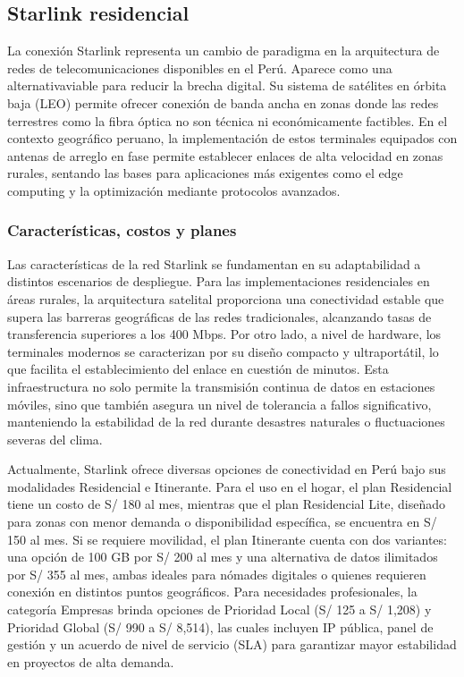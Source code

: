 \subsection{Starlink residencial}

La conexión Starlink representa un cambio de paradigma en la arquitectura de redes de telecomunicaciones disponibles en el Perú. 
Aparece como una alternativaviable para reducir la brecha digital. 
Su sistema de satélites en órbita baja (LEO) permite ofrecer conexión de
banda ancha en zonas donde las redes terrestres como la fibra óptica no son técnica ni económicamente
factibles.
En el contexto geográfico peruano, la implementación de estos terminales equipados con antenas de arreglo en fase permite 
establecer enlaces de alta velocidad en zonas rurales, sentando las bases para aplicaciones más exigentes como el edge computing y la optimización mediante protocolos avanzados. 

\subsubsection{Características, costos y planes}

Las características de la red Starlink se fundamentan en su adaptabilidad a distintos escenarios de despliegue. 
Para las implementaciones residenciales en áreas rurales, la arquitectura satelital proporciona una conectividad estable que supera las barreras geográficas de las redes tradicionales, 
alcanzando tasas de transferencia superiores a los 400 Mbps. 
Por otro lado, a nivel de hardware, los terminales modernos se caracterizan por su diseño compacto y ultraportátil, lo que facilita el establecimiento del enlace en cuestión de minutos. 
Esta infraestructura no solo permite la transmisión continua de datos en estaciones móviles, sino que también asegura un nivel de tolerancia a fallos significativo, manteniendo la estabilidad de la red durante desastres naturales o fluctuaciones severas del clima.

Actualmente, Starlink ofrece diversas opciones de conectividad en Perú bajo sus modalidades Residencial e Itinerante. 
Para el uso en el hogar, el plan Residencial tiene un costo de S/ 180 al mes, mientras que el plan Residencial Lite, diseñado para zonas con menor demanda o disponibilidad específica, se encuentra en S/ 150 al mes. 
Si se requiere movilidad, el plan Itinerante cuenta con dos variantes: una opción de 100 GB por S/ 200 al mes y una alternativa de datos ilimitados por S/ 355 al mes, ambas ideales para nómades digitales o quienes requieren conexión en distintos puntos geográficos.
Para necesidades profesionales, la categoría Empresas brinda opciones de Prioridad Local (S/ 125 a S/ 1,208) y Prioridad Global (S/ 990 a S/ 8,514), 
las cuales incluyen IP pública, panel de gestión y un acuerdo de nivel de servicio (SLA) para garantizar mayor estabilidad en proyectos de alta demanda.

